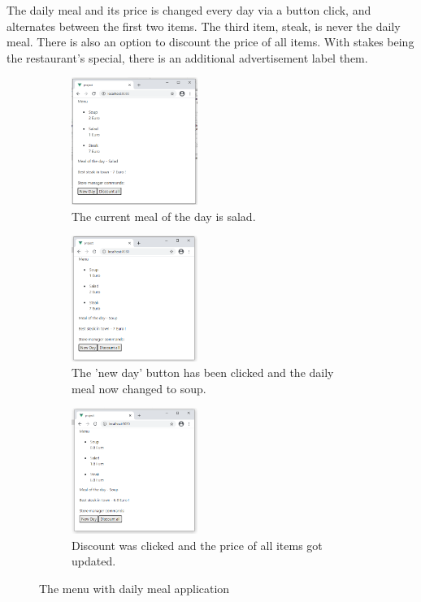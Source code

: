 The daily meal and its price is changed every day via a button click, and alternates between the first two items. The third item, steak, is never the daily meal. There is also an option to discount the price of all items. With stakes being the restaurant's special, there is an additional advertisement label them.
\begin{figure}[H]
    \centering
    \begin{subfigure}[t]{0.45\textwidth}
         \centering
         \includegraphics[width=0.45\textwidth]{images/meal_1.png}
         \caption{The current meal of the day is salad.}
    \end{subfigure}\hfill%
    \begin{subfigure}[t]{0.45\textwidth}
        \centering
        \includegraphics[width=0.45\textwidth]{images/meal_2.png}
        \caption{The 'new day' button has been clicked and the daily meal now changed to soup.}
    \end{subfigure}\hfill%
    \begin{subfigure}[t]{0.45\textwidth}
        \centering
        \includegraphics[width=0.45\textwidth]{images/meal_3.png}
        \caption{Discount was clicked and the price of all items got updated.}
    \end{subfigure}
    \caption{The menu with daily meal application }
    \label{fig:eval_image_meal}
\end{figure}

